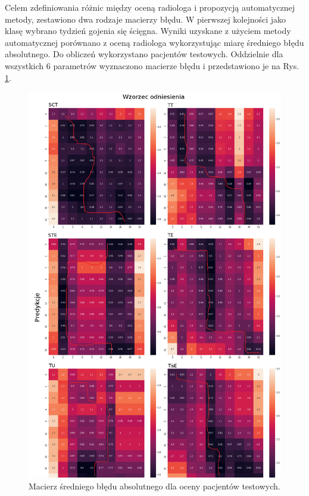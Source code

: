 Celem zdefiniowania różnic między oceną radiologa i propozycją automatycznej metody, zestawiono dwa rodzaje macierzy błędu. W pierwszej kolejności jako klasę wybrano tydzień gojenia się ścięgna. Wyniki uzyskane z użyciem metody automatycznej porównano z oceną radiologa wykorzystując miarę średniego błędu absolutnego. Do obliczeń wykorzystano pacjentów testowych. Oddzielnie dla wszystkich 6 parametrów wyznaczono macierze błędu i przedstawiono je na Rys. \ref{fig:CM_MAE}. 
\begin{figure}[]
	\centering
	\includegraphics[width=1\textwidth]{figures/cm.png}
	\caption{Macierz średniego błędu absolutnego dla oceny pacjentów testowych.}\label{fig:CM_MAE}
\end{figure}

